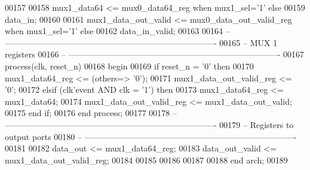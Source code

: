 \begin{DoxyCode}
00157 
00158 \textcolor{vhdlchar}{mux1_data64}             \textcolor{vhdlchar}{<=} \textcolor{vhdlchar}{mux0_data64_reg}         \textcolor{keywordflow}{when} \textcolor{vhdlchar}{mux1_sel}\textcolor{vhdlchar}{=}\textcolor{vhdlchar}{'}\textcolor{vhdllogic}{}\textcolor{vhdllogic}{1}\textcolor{vhdlchar}{'} \textcolor{keywordflow}{else} 
00159                         \textcolor{vhdlchar}{data_in};
00160 
00161 \textcolor{vhdlchar}{mux1_data_out_valid}     \textcolor{vhdlchar}{<=} \textcolor{vhdlchar}{mux0_data_out_valid_reg} \textcolor{keywordflow}{when} \textcolor{vhdlchar}{mux1_sel}\textcolor{vhdlchar}{=}\textcolor{vhdlchar}{'}\textcolor{vhdllogic}{}\textcolor{vhdllogic}{1}\textcolor{vhdlchar}{'} \textcolor{keywordflow}{else} 
00162                         \textcolor{vhdlchar}{data_in_valid};
00163 
00164 \textcolor{keyword}{-- ----------------------------------------------------------------------------}
00165 \textcolor{keyword}{-- MUX 1 registers}
00166 \textcolor{keyword}{-- ----------------------------------------------------------------------------                            
              }
00167 \textcolor{keywordflow}{process}(clk, reset_n)
00168 \textcolor{vhdlkeyword}{begin }
00169    \textcolor{keywordflow}{if} \textcolor{vhdlchar}{reset_n} \textcolor{vhdlchar}{=} \textcolor{vhdlchar}{'}\textcolor{vhdllogic}{}\textcolor{vhdllogic}{0}\textcolor{vhdlchar}{'} \textcolor{keywordflow}{then} 
00170       \textcolor{vhdlchar}{mux1_data64_reg}         \textcolor{vhdlchar}{<=} \textcolor{vhdlchar}{(}\textcolor{keywordflow}{others}\textcolor{vhdlchar}{=}\textcolor{vhdlchar}{>} \textcolor{vhdlchar}{'}\textcolor{vhdllogic}{}\textcolor{vhdllogic}{0}\textcolor{vhdlchar}{'}\textcolor{vhdlchar}{)};
00171       \textcolor{vhdlchar}{mux1_data_out_valid_reg} \textcolor{vhdlchar}{<=} \textcolor{vhdlchar}{'}\textcolor{vhdllogic}{}\textcolor{vhdllogic}{0}\textcolor{vhdlchar}{'};
00172    \textcolor{keywordflow}{elsif} \textcolor{vhdlchar}{(}\textcolor{vhdlchar}{clk}\textcolor{vhdlchar}{'}\textcolor{vhdlkeyword}{event} \textcolor{keywordflow}{AND} \textcolor{vhdlchar}{clk} \textcolor{vhdlchar}{=} \textcolor{vhdlchar}{'}\textcolor{vhdllogic}{}\textcolor{vhdllogic}{1}\textcolor{vhdlchar}{'}\textcolor{vhdlchar}{)} \textcolor{keywordflow}{then} 
00173       \textcolor{vhdlchar}{mux1_data64_reg}         \textcolor{vhdlchar}{<=} \textcolor{vhdlchar}{mux1_data64};
00174       \textcolor{vhdlchar}{mux1_data_out_valid_reg} \textcolor{vhdlchar}{<=} \textcolor{vhdlchar}{mux1_data_out_valid};
00175    \textcolor{keywordflow}{end} \textcolor{keywordflow}{if};
00176 \textcolor{keywordflow}{end} \textcolor{keywordflow}{process};
00177 
00178 \textcolor{keyword}{-- ----------------------------------------------------------------------------}
00179 \textcolor{keyword}{-- Registers to output ports}
00180 \textcolor{keyword}{-- ----------------------------------------------------------------------------}
00181 
00182 \textcolor{vhdlchar}{data_out}       \textcolor{vhdlchar}{<=} \textcolor{vhdlchar}{mux1_data64_reg};
00183 \textcolor{vhdlchar}{data_out_valid} \textcolor{vhdlchar}{<=} \textcolor{vhdlchar}{mux1_data_out_valid_reg};
00184 
00185 
00186 
00187 
00188 \textcolor{keywordflow}{end} \textcolor{vhdlchar}{arch};   
00189 
\end{DoxyCode}
